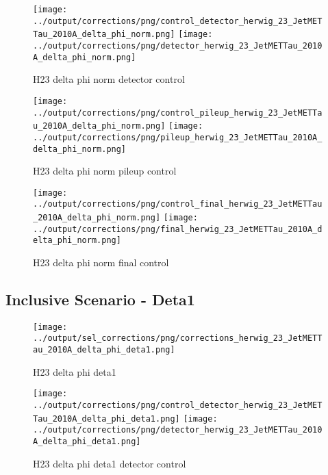 \documentclass[11pt]{book}
\begin{document}
\begin{figure}[ht]
\centering
\texttt{[image: ../output/corrections/png/control\_detector\_herwig\_23\_JetMETTau\_2010A\_delta\_phi\_norm.png]}
\texttt{[image: ../output/corrections/png/detector\_herwig\_23\_JetMETTau\_2010A\_delta\_phi\_norm.png]}
\caption{H23 delta phi norm detector control}
\label{fig:H23_JetMETTau_2010A_delta_phi_norm_detector_control}
\end{figure}

\begin{figure}[ht]
\centering
\texttt{[image: ../output/corrections/png/control\_pileup\_herwig\_23\_JetMETTau\_2010A\_delta\_phi\_norm.png]}
\texttt{[image: ../output/corrections/png/pileup\_herwig\_23\_JetMETTau\_2010A\_delta\_phi\_norm.png]}
\caption{H23 delta phi norm pileup control}
\label{fig:H23_JetMETTau_2010A_delta_phi_norm_pileup_control}
\end{figure}


\begin{figure}[ht]
\centering
\texttt{[image: ../output/corrections/png/control\_final\_herwig\_23\_JetMETTau\_2010A\_delta\_phi\_norm.png]}
\texttt{[image: ../output/corrections/png/final\_herwig\_23\_JetMETTau\_2010A\_delta\_phi\_norm.png]}
\caption{H23 delta phi norm final control}
\label{fig:H23_JetMETTau_2010A_delta_phi_norm_final_control}
\end{figure}

\clearpage
\subsection{Inclusive Scenario - Deta1}

\begin{figure}[ht]
\centering
\texttt{[image: ../output/sel\_corrections/png/corrections\_herwig\_23\_JetMETTau\_2010A\_delta\_phi\_deta1.png]}
\caption{H23 delta phi deta1}
\label{fig:H23_JetMETTau_2010A_delta_phi_deta1}
\end{figure}


\begin{figure}[ht]
\centering
\texttt{[image: ../output/corrections/png/control\_detector\_herwig\_23\_JetMETTau\_2010A\_delta\_phi\_deta1.png]}
\texttt{[image: ../output/corrections/png/detector\_herwig\_23\_JetMETTau\_2010A\_delta\_phi\_deta1.png]}
\caption{H23 delta phi deta1 detector control}
\label{fig:H23_JetMETTau_2010A_delta_phi_deta1_detector_control}
\end{figure}
\end{document}
